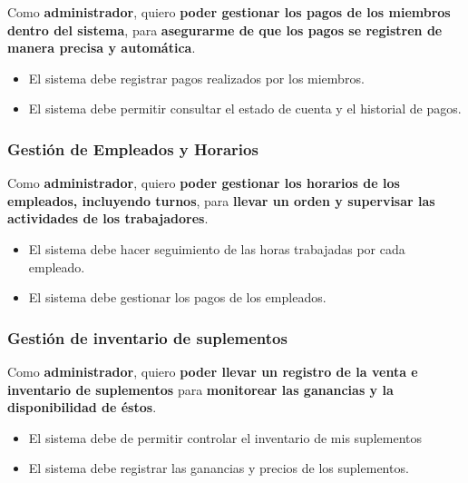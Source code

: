 \documentclass[spanish, 12pt]{article}
\providecommand{\tightlist}{\setlength{\itemsep}{0pt}
\setlength{\parskip}{0pt}}
\begin{document}
	Como \textbf{administrador}, quiero \textbf{poder gestionar los pagos de los
	miembros dentro del sistema}, para \textbf{asegurarme de que los pagos se
	registren de manera precisa y automática}.

	\begin{itemize}
		\tightlist

		\item El sistema debe registrar pagos realizados por los miembros.

		\item El sistema debe permitir consultar el estado de cuenta y el historial de
			pagos.
	\end{itemize}

	\subsubsection{Gestión de Empleados y Horarios}
	\label{gestiuxf3n-de-empleados-y-horarios}

	Como \textbf{administrador}, quiero \textbf{poder gestionar los horarios de
	los empleados, incluyendo turnos}, para \textbf{llevar un orden y supervisar
	las actividades de los trabajadores}.

	\begin{itemize}
		\tightlist

		\item El sistema debe hacer seguimiento de las horas trabajadas por cada empleado.

		\item El sistema debe gestionar los pagos de los empleados.
	\end{itemize}

	\subsubsection{Gestión de inventario de suplementos}
	\label{gestiuxf3n-de-inventario-de-suplementos}

	Como \textbf{administrador}, quiero \textbf{poder llevar un registro de la
	venta e inventario de suplementos} para \textbf{monitorear las ganancias y la
	disponibilidad de éstos}.

	\begin{itemize}
		\tightlist

		\item El sistema debe de permitir controlar el inventario de mis suplementos

		\item El sistema debe registrar las ganancias y precios de los suplementos.
	\end{itemize}
\end{document}
